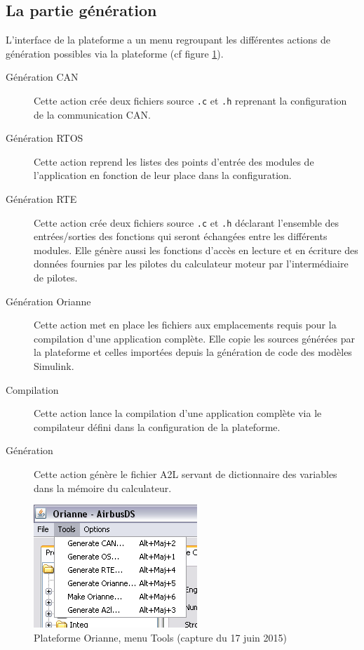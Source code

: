 \subsection{La partie génération}
L'interface de la plateforme a un menu regroupant les différentes actions de
génération possibles via la plateforme (cf figure \ref{fig:toolsMenu}).
\begin{description}
  \item[Génération CAN] Cette action crée deux fichiers source {\tt.c} et {\tt .h} reprenant la configuration de la communication CAN.
  \item[Génération RTOS] Cette action reprend les listes des points d'entrée des modules de l'application en fonction de leur place dans la configuration.
  \item[Génération RTE] Cette action crée deux fichiers source {\tt.c} et {\tt .h} déclarant l'ensemble des entrées/sorties des fonctions qui seront échangées entre les différents modules. Elle génère aussi les fonctions d'accès en lecture et en écriture des données fournies par les pilotes du calculateur moteur par l'intermédiaire de pilotes.
  \item[Génération Orianne] Cette action met en place les fichiers aux emplacements requis pour la compilation d'une application complète. Elle copie les sources générées par la plateforme et celles importées depuis la génération de code des modèles Simulink\up{\circledR}.
  \item[Compilation] Cette action lance la compilation d'une application complète via le compilateur défini dans la configuration de la plateforme.
  \item[Génération ] Cette action génère le fichier A2L servant de dictionnaire des variables dans la mémoire du calculateur.
\end{description}

\begin{figure}[h]
  \centering
  \includegraphics[scale=0.7]{images/toolsMenu}
  \caption{Plateforme Orianne, menu Tools (capture du 17 juin 2015)}
  \label{fig:toolsMenu}
\end{figure}

